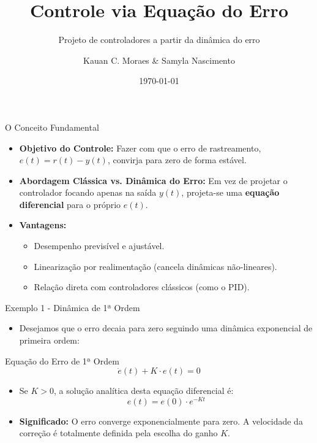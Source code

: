 \documentclass[11pt, aspectratio=169]{beamer}
\title[Controle via Equação do Erro]{Controle via Equação do Erro}
\subtitle{Projeto de controladores a partir da dinâmica do erro}
\author[Kauan \& Samyla]{Kauan C. Moraes \& Samyla Nascimento}
\date{\today}
\begin{document}
\begin{frame}
    \titlepage
\end{frame}

\begin{frame}{O Conceito Fundamental}
    \begin{itemize}
        \item \textbf{Objetivo do Controle:} Fazer com que o erro de rastreamento, $e(t) = r(t) - y(t)$, convirja para zero de forma estável.
        \item \textbf{Abordagem Clássica vs. Dinâmica do Erro:} Em vez de projetar o controlador focando apenas na saída $y(t)$, projeta-se uma \textbf{equação diferencial} para o próprio $e(t)$.
        \item \textbf{Vantagens:}
        \begin{itemize}
            \item Desempenho previsível e ajustável.
            \item Linearização por realimentação (cancela dinâmicas não-lineares).
            \item Relação direta com controladores clássicos (como o PID).
        \end{itemize}
    \end{itemize}
\end{frame}

\begin{frame}{Exemplo 1 - Dinâmica de 1ª Ordem}
    \begin{itemize}
        \item Desejamos que o erro decaia para zero seguindo uma dinâmica exponencial de primeira ordem:
    \end{itemize}
    
    \begin{block}{Equação do Erro de 1ª Ordem}
        \[ \dot{e}(t) + K \cdot e(t) = 0 \]
    \end{block}
    
    \begin{itemize}
        \item Se $K > 0$, a solução analítica desta equação diferencial é:
        \[ e(t) = e(0) \cdot e^{-Kt} \]
        \item \textbf{Significado:} O erro converge exponencialmente para zero. A velocidade da correção é totalmente definida pela escolha do ganho $K$.
    \end{itemize}
\end{frame}
\end{document}
